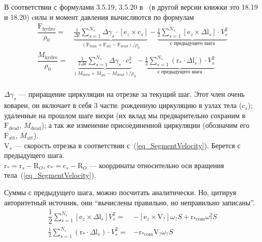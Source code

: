 \documentclass[a4paper,14pt]{extreport}
\newcommand{\br}[1]{\boldsymbol{\mathrm{#1}}}
\renewcommand{\vec}[1]{\br{#1}}
\newcommand{\com}{\text{com}}
\newcommand{\att}{\text{att}}
\begin{document}
В соответствии с формулами 3.5.19, 3.5.20 в~\cite{vvd_book} (в другой версии книжки это 18.19 и 18.20) cилы и момент давления вычисляются по формулам
\begin{equation}
\label{eq_force}
\begin{split}
\dfrac{\vec F_\text{hydro}}{\rho_0} =& 
\underbrace {
	\frac{1}{\Delta t} \sum\limits_{s=1}^{N_s} {\Delta \gamma_s \cdot [\vec e_z \times \vec c_s]}
}_{(\vec F_\text{born} + \vec F_\att - \vec F_\text{dead})/\rho_0} -
\underbrace {
	\frac{1}{2} \sum\limits_{s=1}^{N_s}
		[\vec e_z \times \Delta \vec l_s] \cdot V_s^2
}_{\text{с предыдущего шага}}\\
%
\dfrac{M_\text{hydro}}{\rho_0} =&
\underbrace{
	\frac{1}{2\Delta t}\sum\limits_{s=1}^{N_s} { \Delta \gamma_s \cdot \vec c_*^2 }
}_{(M_\text{born} + M_\att - M_\text{dead})/\rho_0} -
\underbrace {
	\frac{1}{2} \sum\limits_{s=1}^{N_s}
		(\vec r_* \cdot \Delta \vec l_s) \cdot V_s^2
}_{\text{с предыдущего шага}}\\
\end{split}
\end{equation}
%

$\Delta \gamma_s$ --- приращение циркуляции на отрезке за текущий шаг. Этот член очень коварен, он включает в себя 3 части: рожденную циркуляцию в узлах тела ($\vec c_s$); удаленные на прошлом шаге вихри (их вклад мы предварительно сохраним в $\vec F_\text{dead}$, $M_\text{dead}$); а так же изменение присоединенной циркуляции (обозначим его $\vec F_\att$, $M_\att$).\\
$\vec V_s$ --- скорость отрезка в соответствии с~(\ref{eq_SegmentVelocity}). Берется с предыдущего шага.\\
$\vec r_* = \vec r_s - \vec R_O$, $\vec c_* = \vec c_s - \vec R_O$ --- координаты относительно оси вращения тела~(\ref{eq_SegmentVelocity}).

Суммы с предыдущего шага, можно посчитать аналитически. Но, цитируя авторитетный источник, они ``вычислены правильно, но неправильно записаны''.
\begin{equation}
\begin{split}
\dfrac{1}{2} \sum_{s=1}^{N_s} [\vec e_z \times \Delta \vec l_s] V_s^2
=& -[\vec e_z \times \vec V_?]\omega_? S + \vec r_{*\com} \omega_?^2 S \\
\frac{1}{2} \sum_{s=1}^{N_s} (\vec r_* \cdot \Delta \vec l_s) \cdot V_s^2
=& - \vec r_{*\com} \vec V_? \omega_? S\\
\end{split}
\end{equation}
\end{document}
